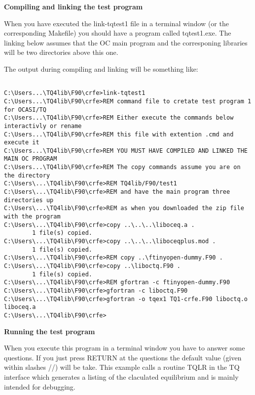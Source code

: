 \documentclass[12pt]{article}
\begin{document}
\newpage

{\bf Compiling and linking the test program}

\bigskip

When you have executed the link-tqtest1 file in a terminal window (or
the corresponding Makefile) you should have a program called
tqtest1.exe.  The linking below assumes that the OC main program and
the corresponing libraries will be two directories above this one.

The output during compiling and linking will be something like:

{\small
\begin{verbatim}

C:\Users...\TQ4lib\F90\crfe>link-tqtest1
C:\Users...\TQ4lib\F90\crfe>REM command file to cretate test program 1 for OCASI/TQ
C:\Users...\TQ4lib\F90\crfe>REM Either execute the commands below interactivly or rename
C:\Users...\TQ4lib\F90\crfe>REM this file with extention .cmd and execute it
C:\Users...\TQ4lib\F90\crfe>REM YOU MUST HAVE COMPILED AND LINKED THE MAIN OC PROGRAM
C:\Users...\TQ4lib\F90\crfe>REM The copy commands assume you are on the directory
C:\Users\...\TQ4lib\F90\crfe>REM TQ4lib/F90/test1
C:\Users\...\TQ4lib\F90\crfe>REM and have the main program three directories up
C:\Users\...\TQ4lib\F90\crfe>REM as when you downloaded the zip file with the program
C:\Users\...\TQ4lib\F90\crfe>copy ..\..\..\liboceq.a .
        1 file(s) copied.
C:\Users\...\TQ4lib\F90\crfe>copy ..\..\..\liboceqplus.mod .
        1 file(s) copied.
C:\Users\...\TQ4lib\F90\crfe>REM copy ..\ftinyopen-dummy.F90 .
C:\Users\...\TQ4lib\F90\crfe>copy ..\liboctq.F90 .
        1 file(s) copied.
C:\Users\...\TQ4lib\F90\crfe>REM gfortran -c ftinyopen-dummy.F90
C:\Users\...\TQ4lib\F90\crfe>gfortran -c liboctq.F90
C:\Users\...\TQ4lib\F90\crfe>gfortran -o tqex1 TQ1-crfe.F90 liboctq.o liboceq.a
C:\Users\...\TQ4lib\F90\crfe>

\end{verbatim}
}

\newpage

\bigskip

{\bf Running the test program}

\bigskip

When you execute this program in a terminal window you have to answer
some questions.  If you just press RETURN at the questions the default
value (given within slashes //) will be take.  This example calls a
routine TQLR in the TQ interface which generates a listing of the
claculated equilibrium and is mainly intended for debugging.
\end{document}

